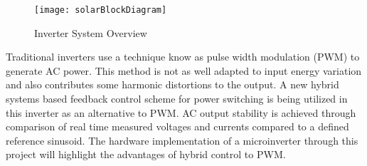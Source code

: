 \begin{figure}
\centering
\texttt{[image: solarBlockDiagram]}
\caption{Inverter System Overview}
\label{Figure 1}
\end{figure}



Traditional inverters use a technique know as pulse width modulation (PWM) to generate AC power. This method is not as well adapted to input energy variation and also contributes some harmonic distortions to the output. A new hybrid systems based feedback control scheme for power switching is being utilized in this inverter as an alternative to PWM. AC output stability is achieved through comparison of real time measured voltages and currents compared to a defined reference sinusoid.\cite{91} The hardware implementation  of a microinverter through this project will highlight the advantages of hybrid control to PWM.




